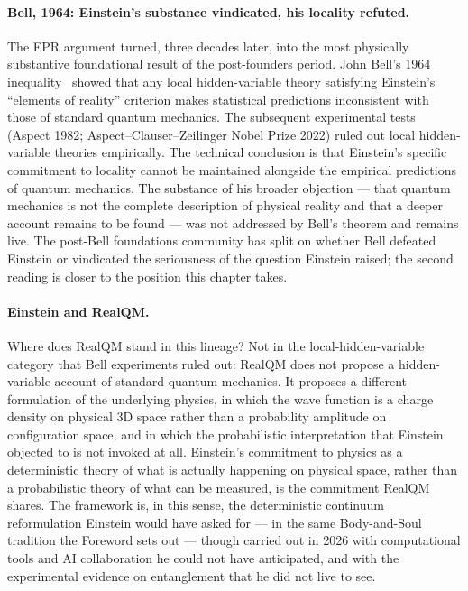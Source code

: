 \paragraph{Bell, 1964: Einstein's substance vindicated, his locality refuted.}
The EPR argument turned, three decades later, into the most physically substantive foundational result of the post-founders period. John Bell's 1964 inequality~\cite{BellSpeakable} showed that any local hidden-variable theory satisfying Einstein's ``elements of reality'' criterion makes statistical predictions inconsistent with those of standard quantum mechanics. The subsequent experimental tests (Aspect 1982; Aspect--Clauser--Zeilinger Nobel Prize 2022) ruled out local hidden-variable theories empirically. The technical conclusion is that Einstein's specific commitment to locality cannot be maintained alongside the empirical predictions of quantum mechanics. The substance of his broader objection --- that quantum mechanics is not the complete description of physical reality and that a deeper account remains to be found --- was not addressed by Bell's theorem and remains live. The post-Bell foundations community has split on whether Bell defeated Einstein or vindicated the seriousness of the question Einstein raised; the second reading is closer to the position this chapter takes.

\paragraph{Einstein and RealQM.}
Where does RealQM stand in this lineage? Not in the local-hidden-variable category that Bell experiments ruled out: RealQM does not propose a hidden-variable account of standard quantum mechanics. It proposes a different formulation of the underlying physics, in which the wave function is a charge density on physical 3D space rather than a probability amplitude on configuration space, and in which the probabilistic interpretation that Einstein objected to is not invoked at all. Einstein's commitment to physics as a deterministic theory of what is actually happening on physical space, rather than a probabilistic theory of what can be measured, is the commitment RealQM shares. The framework is, in this sense, the deterministic continuum reformulation Einstein would have asked for --- in the same Body-and-Soul tradition the Foreword sets out --- though carried out in 2026 with computational tools and AI collaboration he could not have anticipated, and with the experimental evidence on entanglement that he did not live to see.

